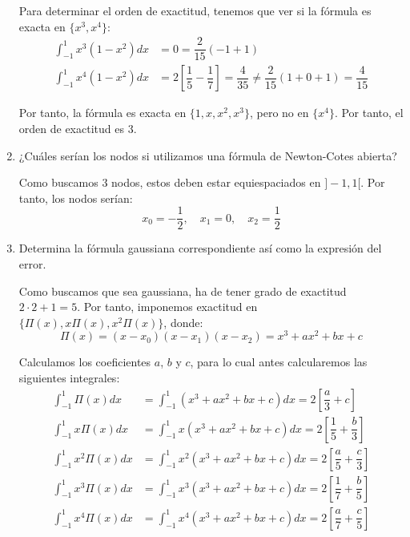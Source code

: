 \begin{ejercicio}
\begin{enumerate}
        Para determinar el orden de exactitud, tenemos que ver si la fórmula es exacta en $\{x^3,x^4\}$:
        \begin{align*}
            \int_{-1}^{1} x^3(1 - x^2)dx &= 0 = \dfrac{2}{15}\left(-1+1\right) \\
            \int_{-1}^{1} x^4(1 - x^2)dx &= 2\left[\dfrac{1}{5} - \dfrac{1}{7}\right] = \dfrac{4}{35} \neq \dfrac{2}{15}\left(1+0+1\right) = \dfrac{4}{15}
        \end{align*}

        Por tanto, la fórmula es exacta en $\{1,x,x^2,x^3\}$, pero no en $\{x^4\}$. Por tanto, el orden de exactitud es $3$.
        \item ¿Cuáles serían los nodos si utilizamos una fórmula de Newton-Cotes abierta?
        
        Como buscamos $3$ nodos, estos deben estar equiespaciados en $]-1,1[$. Por tanto, los nodos serían:
        \begin{equation*}
            x_0 = -\frac{1}{2}, \quad x_1 = 0, \quad x_2 = \frac{1}{2}
        \end{equation*}
        \item\label{ap:3} Determina la fórmula gaussiana correspondiente así como la expresión del error.
        
        Como buscamos que sea gaussiana, ha de tener grado de exactitud $2\cdot 2+1 = 5$. Por tanto, imponemos exactitud en $\{\Pi(x), x\Pi(x), x^2\Pi(x)\}$, donde:
        \begin{equation*}
            \Pi(x) = (x-x_0)(x-x_1)(x-x_2) = x^3+ax^2 + bx + c
        \end{equation*}

        Calculamos los coeficientes $a$, $b$ y $c$, para lo cual antes calcularemos las siguientes integrales:
        \begin{align*}
            \int_{-1}^{1} \Pi(x)dx &= \int_{-1}^{1} (x^3 + ax^2 + bx + c)dx = 2\left[\dfrac{a}{3} + c\right]\\
            \int_{-1}^{1} x\Pi(x)dx &= \int_{-1}^{1} x(x^3 + ax^2 + bx + c)dx = 2\left[\dfrac{1}{5} + \dfrac{b}{3}\right]\\
            \int_{-1}^{1} x^2\Pi(x)dx &= \int_{-1}^{1} x^2(x^3 + ax^2 + bx + c)dx = 2\left[\dfrac{a}{5} + \dfrac{c}{3}\right]\\
            \int_{-1}^{1} x^3\Pi(x)dx &= \int_{-1}^{1} x^3(x^3 + ax^2 + bx + c)dx = 2\left[\dfrac{1}{7} + \dfrac{b}{5}\right]\\
            \int_{-1}^{1} x^4\Pi(x)dx &= \int_{-1}^{1} x^4(x^3 + ax^2 + bx + c)dx = 2\left[\dfrac{a}{7} + \dfrac{c}{5}\right]\\
        \end{align*}


\end{enumerate}
\end{ejercicio}
